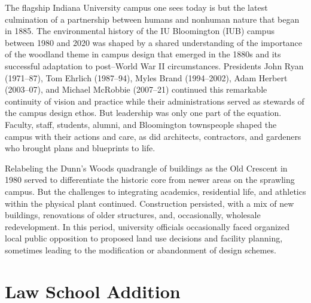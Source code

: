 \documentclass[
  american,
  letterpaper,
]{scrreprt}
\begin{document}
The flagship Indiana University campus one sees today is but the latest
culmination of a partnership between humans and nonhuman nature that
began in 1885. The environmental history of the IU Bloomington (IUB)
campus between 1980 and 2020 was shaped by a shared understanding of the
importance of the woodland theme in campus design that emerged in the
1880s and its successful adaptation to post--World War II circumstances.
Presidents John Ryan (1971--87), Tom Ehrlich (1987--94), Myles Brand
(1994--2002), Adam Herbert (2003--07), and Michael McRobbie (2007--21)
continued this remarkable continuity of vision and practice while their
administrations served as stewards of the campus design ethos. But
leadership was only one part of the equation. Faculty, staff, students,
alumni, and Bloomington townspeople shaped the campus with their actions
and care, as did architects, contractors, and gardeners who brought
plans and blueprints to life.

Relabeling the Dunn's Woods quadrangle of buildings as the Old Crescent
in 1980 served to differentiate the historic core from newer areas on
the sprawling campus. But the challenges to integrating academics,
residential life, and athletics within the physical plant continued.
Construction persisted, with a mix of new buildings, renovations of
older structures, and, occasionally, wholesale redevelopment. In this
period, university officials occasionally faced organized local public
opposition to proposed land use decisions and facility planning,
sometimes leading to the modification or abandonment of design schemes.

\section{Law School Addition}\label{law-school-addition}
\end{document}

